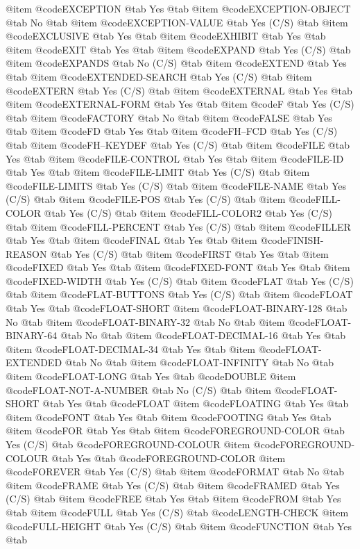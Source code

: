 @item @code{EXCEPTION} @tab Yes @tab
@item @code{EXCEPTION-OBJECT} @tab No @tab
@item @code{EXCEPTION-VALUE} @tab Yes	(C/S) @tab
@item @code{EXCLUSIVE} @tab Yes @tab
@item @code{EXHIBIT} @tab Yes @tab
@item @code{EXIT} @tab Yes @tab
@item @code{EXPAND} @tab Yes	(C/S) @tab
@item @code{EXPANDS} @tab No	(C/S) @tab
@item @code{EXTEND} @tab Yes @tab
@item @code{EXTENDED-SEARCH} @tab Yes (C/S) @tab
@item @code{EXTERN} @tab Yes	(C/S) @tab
@item @code{EXTERNAL} @tab Yes @tab
@item @code{EXTERNAL-FORM} @tab Yes @tab
@item @code{F} @tab Yes	(C/S) @tab
@item @code{FACTORY} @tab No @tab
@item @code{FALSE} @tab Yes @tab
@item @code{FD} @tab Yes @tab
@item @code{FH--FCD} @tab Yes	(C/S) @tab
@item @code{FH--KEYDEF} @tab Yes	(C/S) @tab
@item @code{FILE} @tab Yes @tab
@item @code{FILE-CONTROL} @tab Yes @tab
@item @code{FILE-ID} @tab Yes @tab
@item @code{FILE-LIMIT} @tab Yes (C/S) @tab
@item @code{FILE-LIMITS} @tab Yes (C/S) @tab
@item @code{FILE-NAME} @tab Yes	(C/S) @tab
@item @code{FILE-POS} @tab Yes	(C/S) @tab
@item @code{FILL-COLOR} @tab Yes	(C/S) @tab
@item @code{FILL-COLOR2} @tab Yes	(C/S) @tab
@item @code{FILL-PERCENT} @tab Yes	(C/S) @tab
@item @code{FILLER} @tab Yes @tab
@item @code{FINAL} @tab Yes @tab
@item @code{FINISH-REASON} @tab Yes	(C/S) @tab
@item @code{FIRST} @tab Yes @tab
@item @code{FIXED} @tab Yes @tab
@item @code{FIXED-FONT} @tab Yes @tab
@item @code{FIXED-WIDTH} @tab Yes	(C/S) @tab
@item @code{FLAT} @tab Yes	(C/S) @tab
@item @code{FLAT-BUTTONS} @tab Yes	(C/S) @tab
@item @code{FLOAT} @tab Yes @tab @code{FLOAT-SHORT}
@item @code{FLOAT-BINARY-128} @tab No @tab
@item @code{FLOAT-BINARY-32} @tab No @tab
@item @code{FLOAT-BINARY-64} @tab No @tab
@item @code{FLOAT-DECIMAL-16} @tab Yes @tab
@item @code{FLOAT-DECIMAL-34} @tab Yes @tab
@item @code{FLOAT-EXTENDED} @tab No @tab
@item @code{FLOAT-INFINITY} @tab No @tab
@item @code{FLOAT-LONG} @tab Yes @tab @code{DOUBLE}
@item @code{FLOAT-NOT-A-NUMBER} @tab No	(C/S) @tab
@item @code{FLOAT-SHORT} @tab Yes @tab @code{FLOAT}
@item @code{FLOATING} @tab Yes @tab
@item @code{FONT} @tab Yes @tab
@item @code{FOOTING} @tab Yes @tab
@item @code{FOR} @tab Yes @tab
@item @code{FOREGROUND-COLOR} @tab Yes	(C/S) @tab @code{FOREGROUND-COLOUR}
@item @code{FOREGROUND-COLOUR} @tab Yes @tab @code{FOREGROUND-COLOR}
@item @code{FOREVER} @tab Yes	(C/S) @tab
@item @code{FORMAT} @tab No @tab
@item @code{FRAME} @tab Yes	(C/S) @tab
@item @code{FRAMED} @tab Yes	(C/S) @tab
@item @code{FREE} @tab Yes @tab
@item @code{FROM} @tab Yes @tab
@item @code{FULL} @tab Yes	(C/S) @tab @code{LENGTH-CHECK}
@item @code{FULL-HEIGHT} @tab Yes	(C/S) @tab
@item @code{FUNCTION} @tab Yes @tab
